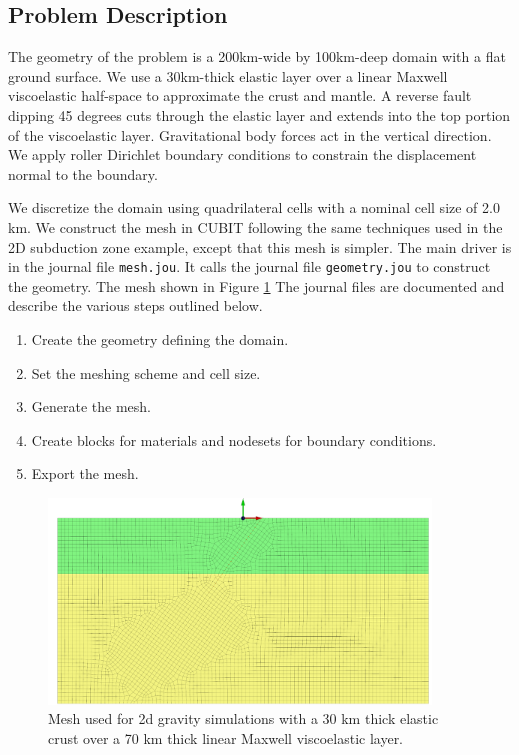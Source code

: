 \subsection{Problem Description}

The geometry of the problem is a 200km-wide by 100km-deep domain with
a flat ground surface. We use a 30km-thick elastic layer over a linear
Maxwell viscoelastic half-space to approximate the crust and mantle.
A reverse fault dipping 45 degrees cuts through the elastic layer
and extends into the top portion of the viscoelastic layer. Gravitational
body forces act in the vertical direction. We apply roller Dirichlet
boundary conditions to constrain the displacement normal to the boundary.

We discretize the domain using quadrilateral cells with a nominal
cell size of 2.0 km. We construct the mesh in CUBIT following the
same techniques used in the 2D subduction zone example, except that
this mesh is simpler. The main driver is in the journal file \texttt{mesh.jou}.
It calls the journal file \texttt{geometry.jou} to construct the geometry.
The mesh shown in Figure \ref{fig:examples:gravity:2d:mesh} The journal
files are documented and describe the various steps outlined below.
\begin{enumerate}
\item Create the geometry defining the domain.
\item Set the meshing scheme and cell size.
\item Generate the mesh.
\item Create blocks for materials and nodesets for boundary conditions.
\item Export the mesh.
\end{enumerate}
\begin{figure}
\begin{centering}
\includegraphics[width=4in]{tutorials/grav2d/figs/mesh}
\par\end{centering}

\caption{Mesh used for 2d gravity simulations with a 30 km thick elastic crust
over a 70 km thick linear Maxwell viscoelastic layer.\label{fig:examples:gravity:2d:mesh}}
\end{figure}



